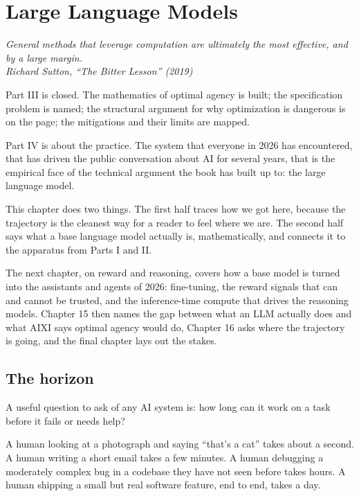 \chapter{Large Language Models}

\vspace{1em}
\hfill
\begin{minipage}[c]{0.65\textwidth}
\raggedleft
\small\itshape
General methods that leverage computation are ultimately the most effective, and by a large margin.\\[0.5em]
\upshape\footnotesize Richard Sutton, ``The Bitter Lesson'' (2019)
\end{minipage}
\vspace{1.5em}

\noindent Part III is closed. The mathematics of optimal agency is built; the specification problem is named; the structural argument for why optimization is dangerous is on the page; the mitigations and their limits are mapped.

Part IV is about the practice. The system that everyone in 2026 has encountered, that has driven the public conversation about AI for several years, that is the empirical face of the technical argument the book has built up to: the large language model.

This chapter does two things. The first half traces how we got here, because the trajectory is the cleanest way for a reader to feel where we are. The second half says what a base language model actually is, mathematically, and connects it to the apparatus from Parts I and II.

The next chapter, on reward and reasoning, covers how a base model is turned into the assistants and agents of 2026: fine-tuning, the reward signals that can and cannot be trusted, and the inference-time compute that drives the reasoning models. Chapter 15 then names the gap between what an LLM actually does and what AIXI says optimal agency would do, Chapter 16 asks where the trajectory is going, and the final chapter lays out the stakes.

\section*{The horizon}

A useful question to ask of any AI system is: how long can it work on a task before it fails or needs help?

A human looking at a photograph and saying ``that's a cat'' takes about a second. A human writing a short email takes a few minutes. A human debugging a moderately complex bug in a codebase they have not seen before takes hours. A human shipping a small but real software feature, end to end, takes a day.

